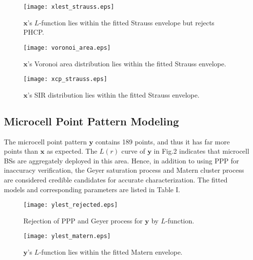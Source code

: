 \documentclass[conference]{IEEEtran}
\begin{document}
\begin{figure}[!t]
\centering
\texttt{[image: xlest\_strauss.eps]}
\caption{$\mathbf{x}$'s $L$-function lies within the fitted Strauss envelope but rejects PHCP.}
\end{figure}

\begin{figure}[!t]
\centering
\texttt{[image: voronoi\_area.eps]}
\caption{$\mathbf{x}$'s Voronoi area distribution lies within the fitted Strauss envelope.}
\end{figure}

\begin{figure}[!t]
\centering
\texttt{[image: xcp\_strauss.eps]}
\caption{$\mathbf{x}$'s SIR distribution lies within the fitted Strauss envelope.}
\end{figure}

\subsection{Microcell Point Pattern Modeling}

The microcell point pattern $\mathbf{y}$ contains 189 points, and thus it has far more points than $\mathbf{x}$ as expected. The $L(r)$ curve of $\mathbf{y}$ in Fig.2 indicates that microcell BSs are aggregately deployed in this area. Hence, in addition to using PPP for inaccuracy verification, the Geyer saturation process and Matern cluster process are considered credible candidates for accurate characterization. The fitted models and corresponding parameters are listed in Table I.

\begin{figure}[!t]
\centering
\texttt{[image: ylest\_rejected.eps]}
\caption{Rejection of PPP and Geyer process for $\mathbf{y}$ by $L$-function.}
\end{figure}

\begin{figure}[!t]
\centering
\texttt{[image: ylest\_matern.eps]}
\caption{$\mathbf{y}$'s $L$-function lies within the fitted Matern envelope.}
\end{figure}
\end{document}
